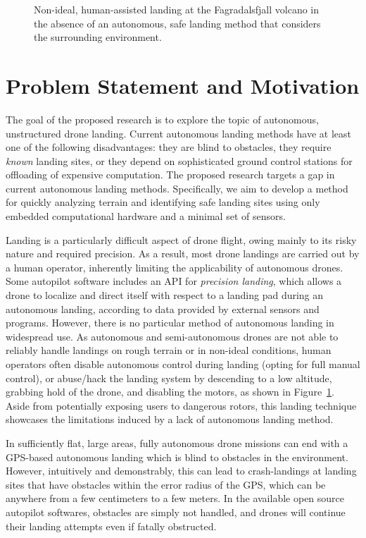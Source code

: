 \begin{figure}[ht]
    \centering
    \begin{minipage}{\wd0}
      \caption{Non-ideal, human-assisted landing at the Fagradalsfjall volcano in the absence of an autonomous, safe landing method that considers the surrounding environment.}
      \label{figure:hand_landing}
    \end{minipage}
\end{figure}

\section{Problem Statement and Motivation}

The goal of the proposed research is to explore the topic of
autonomous, unstructured drone landing.
Current autonomous landing methods have at least one of the following disadvantages:
they are blind to obstacles,
they require \textit{known} landing sites,
or they depend on sophisticated ground control stations for offloading of expensive computation.
The proposed research targets a gap in current autonomous landing methods.
Specifically, we aim to develop a method for quickly analyzing terrain
and identifying safe landing sites using only embedded computational hardware
and a minimal set of sensors.

Landing is a particularly difficult aspect of drone flight,
owing mainly to its risky nature and required precision.
As a result, most drone landings are carried out by a human operator,
inherently limiting the applicability of autonomous drones.
Some autopilot software includes an API for \textit{precision landing},
which allows a drone to localize and direct itself with respect to a landing pad during an autonomous landing,
according to data provided by external sensors and programs.
However, there is no particular method of autonomous landing in widespread use.
As autonomous and semi-autonomous drones are not able to reliably handle landings
on rough terrain or in non-ideal conditions, human operators often disable
autonomous control during landing (opting for full manual control),
or abuse/hack the landing system by descending to a low altitude,
grabbing hold of the drone,
and disabling the motors,
as shown in Figure~\ref{figure:hand_landing}.
Aside from potentially exposing users to dangerous rotors,
this landing technique showcases the limitations induced by a lack of
autonomous landing method.

In sufficiently flat, large areas, fully autonomous drone missions can end with a GPS-based
autonomous landing which is blind to obstacles in the environment.
However,
intuitively and demonstrably,
this can lead to crash-landings at landing sites that have obstacles within
the error radius of the GPS,
which can be anywhere from a few centimeters to a few meters.
In the available open source autopilot softwares,
obstacles are simply not handled,
and drones will continue their landing attempts even if fatally obstructed.